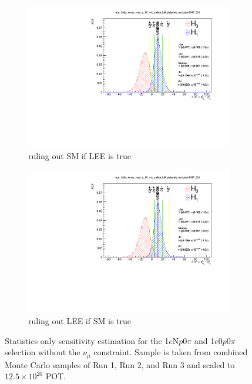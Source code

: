 \documentclass[a4paper]{article}
\newcommand{\numu}{$\nu_{\mu}$\xspace}
\newcommand{\npsel}{1$e$N$p$0$\pi$\xspace}
\newcommand{\zpsel}{1$e$0$p$0$\pi$\xspace}
\begin{document}
\begin{figure}[H]
    \centering
    \begin{subfigure}[b]{0.48\textwidth}
    \centering
    \includegraphics[width=1.00\textwidth]{Sensitivity/sensitivity-run12345/SBNfit_Cls_nue_1e0p_numu_reco_e_H1_mc_collab_full_statsonly_exclusionCNP_Chi.pdf}
    \caption{ruling out SM if LEE is true}
    \end{subfigure}
    \begin{subfigure}[b]{0.48\textwidth}
    \centering
    \includegraphics[width=1.00\textwidth]{Sensitivity/sensitivity-run12345/SBNfit_Cls_nue_1e0p_numu_reco_e_H1_mc_collab_full_statsonly_exclusionCNP_Chi.pdf}
    \caption{ruling out LEE if SM is true}
    \end{subfigure}
    \caption{Statistics only sensitivity estimation for the \npsel and \zpsel selection without the \numu constraint. Sample is taken from combined Monte Carlo samples of Run 1, Run 2, and Run 3 and scaled to $12.5\times10^20$ POT.}
    \label{fig:1eNp:BDT:statsystsensitivity}
\end{figure}
\end{document}
